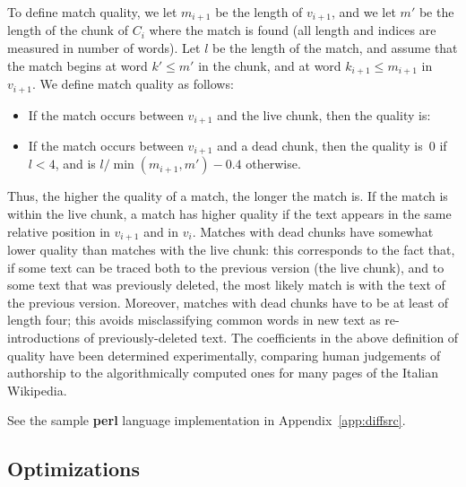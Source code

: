 To define match quality, we let $m_{i+1}$ be the length of $v_{i+1}$,
and we let $m'$ be the length of the chunk of $C_i$ where the match is
found (all length and indices are measured in number of words).
Let $l$ be the length of the match, and assume that the match begins
at word $k' \leq m'$ in the chunk, and at word $k_{i+1} \leq m_{i+1}$
in $v_{i+1}$.
We define match quality as follows:
%
\begin{itemize}
\item If the match occurs between $v_{i+1}$ and the live chunk, then
the quality is:
\item If the match occurs between $v_{i+1}$ and a dead chunk, then the
quality is~0 if $l < 4$, and is
$
  {l}/{\min(m_{i+1},m')} - 0.4
$ otherwise.
\end{itemize}
%
Thus, the higher the quality of a match, the longer the match is.
If the match is within the live chunk, a match has higher quality if the
text appears in the same relative position in $v_{i+1}$ and in $v_i$.
Matches with dead chunks have somewhat lower quality than matches with
the live chunk: this corresponds to the fact that, if some text can be
traced both to the previous version (the live chunk), and to some
text that was previously deleted, the most likely match is with the
text of the previous version.
Moreover, matches with dead chunks have to be at least of length four;
this avoids misclassifying common words in new text as re-introductions
of previously-deleted text.
The coefficients in the above definition of quality have been
determined experimentally, comparing human judgements of authorship to
the algorithmically computed ones for many pages of the Italian
Wikipedia.

See the sample \textbf{perl} language implementation
in Appendix~\ref{app:diffsrc}.

\subsection{Optimizations}

